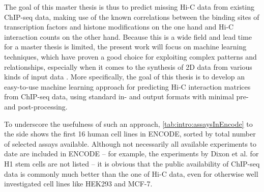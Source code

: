 The goal of this master thesis is thus to predict missing Hi-C data from existing ChIP-seq data,
making use of the known correlations between the binding sites of transcription factors and histone modifications on the one hand 
and Hi-C interaction counts on the other hand. 
Because this is a wide field and lead time for a master thesis is limited, 
the present work will focus on machine learning techniques,
which have proven a good choice for exploiting complex patterns
and relationships, especially when it comes to the synthesis of 
2D data from various kinds of input data \cite{Tsirikoglou2020}.
More specifically, the goal of this thesis is to develop an easy-to-use machine learning
approach for predicting Hi-C interaction matrices from ChIP-seq data, 
using standard in- and output formats with minimal pre- and post-processing.

To underscore the usefulness of such an approach, \cref{tab:intro:assaysInEncode} to the side shows the first 16 human cell lines in ENCODE, 
sorted by total number of selected assays available.
Although not necessarily all available experiments to date are included in ENCODE -- 
for example, the experiments by Dixon et al. \cite{Dixon2015} for H1 stem cells are not listed -- 
it is obvious that the public availability of ChIP-seq data is commonly much better than the one of Hi-C data, 
even for otherwise well investigated cell lines like HEK293 and MCF-7.


